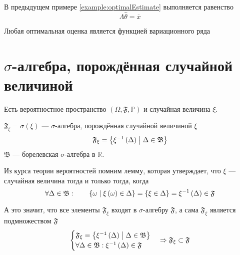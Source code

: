 \begin{comment}
\begin{definition}[Функция вариационного ряда]\index{функция!вариационного ряда}
  Если оценка $\hat{\theta}$ симметрична относительно перестановок аргументов,
  то она является функцией вариационного ряда
\end{definition}
\end{comment}

\begin{remark}
  В предыдущем примере \ref{example:optimalEstimate} выполняется равенство
  \begin{equation*}
    \Lambda \hat{\theta} = \overline{x}
  \end{equation*}
\end{remark}

\begin{remark}
  Любая оптимальная оценка является функцией вариационного ряда
\end{remark}

\section{$\sigma$-алгебра, порождённая случайной величиной}
Есть вероятностное пространство
$\left( \Omega, \mathfrak{F}, \mathbb{P} \right)$
и случайная величина $\xi$.

\begin{definition}
  $\mathfrak{F}_\xi = \sigma\left( \xi \right)$
  --- $\sigma$-алгебра, порождённая случайной величиной $\xi$
  $$\mathfrak{F}_\xi
      = \left\{ \xi^{-1}\left( \Delta \right)
      \;\middle|\; \Delta\in\mathfrak{B} \right\}$$
  $\mathfrak{B}$ --- борелевская $\sigma$-алгебра в $\mathbb{R}$.
\end{definition}

Из курса теории вероятностей помним лемму, которая утверждает,
что $\xi$ --- случайная величина тогда и только тогда, когда
\begin{equation*}
  \forall\Delta\in\mathfrak{B}:\qquad
  \left\{ \omega \;\middle|\; \xi\left( \omega \right) \in \Delta \right\}
  = \left\{ \xi\in\Delta \right\}
  = \xi^{-1}\left( \Delta \right) \in \mathfrak{F}
\end{equation*}

А это значит, что все элементы $\mathfrak{F}_\xi$ входят в $\sigma$-алгебру
$\mathfrak{F}$, а сама $\mathfrak{F}_\xi$ является подмножеством
$\mathfrak{F}$
\begin{align*}
  \begin{cases}
      \mathfrak{F}_\xi
      = \left\{ \xi^{-1}\left( \Delta \right)
          \;\middle|\; \Delta\in\mathfrak{B} \right\}\\
      \forall\Delta\in\mathfrak{B}:
      \xi^{-1}\left( \Delta \right) \in \mathfrak{F}
  \end{cases}
  \Rightarrow
  \mathfrak{F}_\xi \subset \mathfrak{F}
\end{align*}


